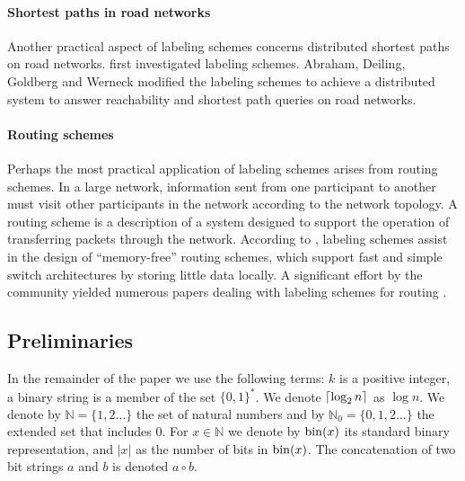 \paragraph{Shortest paths in road networks}
Another practical aspect of labeling schemes concerns distributed shortest paths  on road networks. 
 first investigated \distance labeling schemes. 
Abraham, Deiling, Goldberg and Werneck  modified the labeling schemes to achieve a distributed system to answer reachability and shortest path queries on road networks.

\paragraph{Routing schemes}
Perhaps the most  practical application of labeling schemes arises from  routing schemes.
In a large network, information sent from one participant  to another must visit   other participants in the network according to the network topology. 
A routing scheme is a description of a  system designed to support the operation of transferring packets through the network.
According to , labeling schemes  assist in the design of ``memory-free'' routing schemes, which support fast and simple switch architectures by  storing  little data locally.
 A significant effort by the community yielded numerous  papers dealing with labeling schemes for routing \cite{Peleg03,Thorup01,Fraigniaud01,gavoille96,Dom07,Korman07K,krioukov2004compact,abraham2006routing,abraham2005name}.





\subsection{Preliminaries}\label{section:preliminaries}
In the remainder of the paper we use the following terms:
			$k$ is a positive integer, a binary string is a member of the set $\{ 0,1 \}^*$.
			We denote $\left\lceil{ \log_2{n}}\right\rceil$ as $\log{n}$. 
			We denote by $\mathbb{N} = \{1,2 \dots \} $ the set of natural numbers and by $\mathbb{N}_0 = \{0,1,2 \dots \} $ the extended set that includes $0$.
			For $x \in \mathbb{N}$ we denote by $\operatorname{bin}(x)$ its standard binary representation, and $\vert x \vert$ as the number of bits in $\operatorname{bin}(x)$.
			The concatenation of two bit strings $a$ and $b$ is denoted $a \circ b$.
